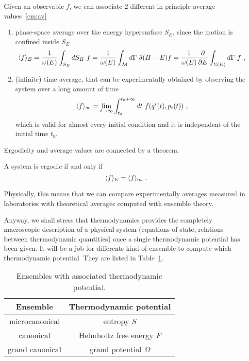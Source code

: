     Given an observable $f$, we can associate $2$ different in principle average values~\eqref{cm:av}
    \begin{enumerate}
        \item phase-space average over the energy hypersurface $S_E$, since the motion is confined inside $S_E$
            \begin{equation*}
                \langle f\rangle_E = \frac{1}{\omega(E)} \int_{S_E} dS_H ~ f = \frac{1}{\omega(E)} \int_{\mathcal M} d \Gamma ~ \delta (H - E) f = \frac{1}{\omega(E)} \frac{\partial}{\partial E} \int_{\Sigma(E)} d \Gamma ~ f ~, 
            \end{equation*}
        \item (infinite) time average, that can be experimentally obtained by observing the system over a long amount of time 
            \begin{equation*}
                \langle f\rangle_\infty = \lim_{t \rightarrow \infty} \int_{t_0}^{t_0 + \infty} dt ~ f(q^i(t), p_i(t)) ~, 
            \end{equation*}
            which is valid for almost every initial condition and it is independent of the initial time $t_0$.
    \end{enumerate}
    Ergodicity and average values are connected by a theorem.
    \begin{theorem}
        A system is ergodic if and only if 
        \begin{equation}\label{cm:erg}
            \langle f\rangle_E = \langle f\rangle_\infty ~.
        \end{equation}
    \end{theorem}
    Physically, this means that we can compare experimentally averages measured in laboratories with theoretical averages computed with ensemble theory. 

    Anyway, we shall stress that thermodynamics provides the completely macroscopic description of a physical system (equations of state, relations between thermodynamic quantities) once a single thermodynamic potential has been given. It will be a job for differents kind of ensemble to compute which thermodynamic potential. They are listed in Table~\ref{table:cm:1}.
    \begin{table}[h!]
        \centering
        \begin{tabular}{c | c }
            Ensemble & Thermodynamic potential \\
            \hline
            microcanonical & entropy $S$ \\ 
            canonical & Helmholtz free energy $F$ \\ 
            grand canonical & grand potential $\Omega$ \\ 
        \end{tabular}
        \caption{Ensembles with associated thermodynamic potential.}
        \label{table:cm:1}
    \end{table}
    
